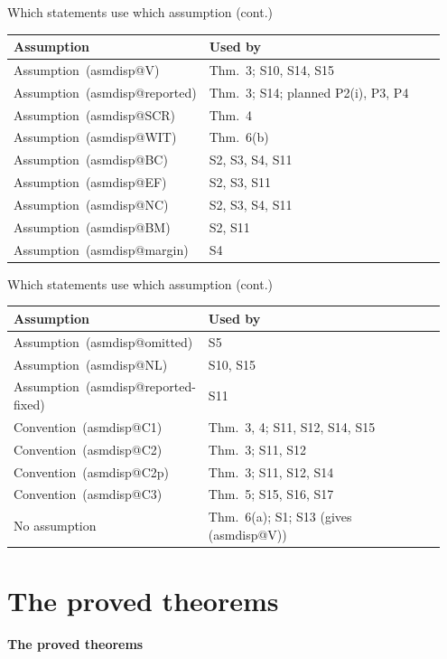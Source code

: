 \documentclass[aspectratio=169]{beamer}
\makeatletter
\newcommand{\asmdisp}[1]{\csname asmdisp@#1\endcsname}
\newcommand{\as}[1]{\textup{(\asmdisp{#1})}}
\makeatother
\begin{document}
\begin{frame}{Which statements use which assumption (cont.)}
\footnotesize
\begin{tabular}{@{}>{\raggedright\arraybackslash}p{0.27\linewidth}>{\raggedright\arraybackslash}p{0.68\linewidth}@{}}
\toprule
Assumption & Used by \\
\midrule
Assumption~\as{V} & Thm.~3; S10, S14, S15 \\
Assumption~\as{reported} & Thm.~3; S14; planned P2(i), P3, P4 \\
Assumption~\as{SCR} & Thm.~4 \\
Assumption~\as{WIT} & Thm.~6(b) \\
Assumption~\as{BC} & S2, S3, S4, S11 \\
Assumption~\as{EF} & S2, S3, S11 \\
Assumption~\as{NC} & S2, S3, S4, S11 \\
Assumption~\as{BM} & S2, S11 \\
Assumption~\as{margin} & S4 \\
\bottomrule
\end{tabular}
\end{frame}

\begin{frame}{Which statements use which assumption (cont.)}
\footnotesize
\begin{tabular}{@{}>{\raggedright\arraybackslash}p{0.27\linewidth}>{\raggedright\arraybackslash}p{0.68\linewidth}@{}}
\toprule
Assumption & Used by \\
\midrule
Assumption~\as{omitted} & S5 \\
Assumption~\as{NL} & S10, S15 \\
Assumption~\as{reported-fixed} & S11 \\
Convention~\as{C1} & Thm.~3, 4; S11, S12, S14, S15 \\
Convention~\as{C2} & Thm.~3; S11, S12 \\
Convention~\as{C2p} & Thm.~3; S11, S12, S14 \\
Convention~\as{C3} & Thm.~5; S15, S16, S17 \\
No assumption & Thm.~6(a); S1; S13 (gives \as{V}) \\
\bottomrule
\end{tabular}
\end{frame}

\section{The proved theorems}
\begin{frame}
\centering\Large\textbf{The proved theorems}
\end{frame}
\end{document}
